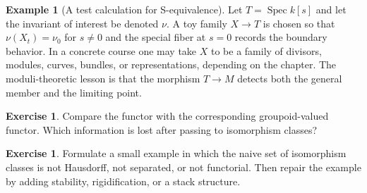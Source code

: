\documentclass[11pt]{amsart}
\theoremstyle{definition}
\newtheorem{example}[theorem]{Example}
\newtheorem{exercise}[theorem]{Exercise}
\newcommand{\Spec}{\operatorname{Spec}}
\begin{document}
\begin{example}[A test calculation for S-equivalence]
Let $T=\Spec k[s]$ and let the invariant of interest be denoted $\nu$.  A toy family $X\to T$ is chosen so that $\nu(X_t)=\nu_0$ for $s\ne0$ and the special fiber at $s=0$ records the boundary behavior.  In a concrete course one may take $X$ to be a family of divisors, modules, curves, bundles, or representations, depending on the chapter.  The moduli-theoretic lesson is that the morphism $T\to M$ detects both the general member and the limiting point.
\end{example}
\begin{exercise}
Compare the functor with the corresponding groupoid-valued functor.  Which information is lost after passing to isomorphism classes?
\end{exercise}
\begin{exercise}
Formulate a small example in which the naive set of isomorphism classes is not Hausdorff, not separated, or not functorial.  Then repair the example by adding stability, rigidification, or a stack structure.
\end{exercise}
\clearpage
\end{document}
